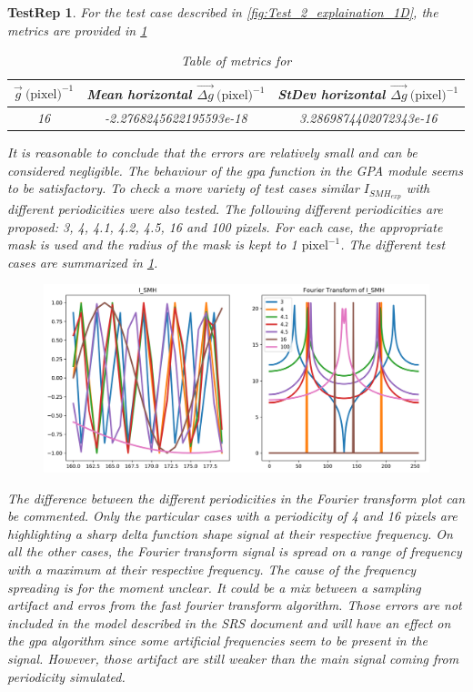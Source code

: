 \documentclass[12pt, titlepage]{article}
\newtheorem{TestRep}{TestRep}
\begin{document}
\begin{TestRep}
For the test case described in \cref{fig:Test_2_explaination_1D}, the metrics are provided in \cref{tb:Metric_test_2_single_case}

\begin{table}[H]
\centering
\begin{tabular}{|c|c|c|}
\hline
$\overrightarrow{g} \ \text{(pixel)}^{-1}$ & Mean horizontal $\overrightarrow{\Delta g} \ \text{(pixel)}^{-1}$ & StDev horizontal $\overrightarrow{\Delta g} \ \text{(pixel)}^{-1}$ \\
\hline
16			& -2.2768245622195593e-18 & 3.2869874402072343e-16 \\ \hline
\end{tabular}
\caption{Table of metrics for}\label{tb:Metric_test_2_single_case}
\end{table}

It is reasonable to conclude that the errors are relatively small and can be considered negligible. The behaviour of the gpa function in the GPA module seems to be satisfactory. To check a more variety of test cases similar $I_{SMH_{exp}}$ with different periodicities were also tested. The following different periodicities are proposed: 3, 4, 4.1, 4.2, 4.5, 16 and 100 pixels. For each case, the appropriate mask is used and the radius of the mask is kept to 1 $\text{pixel}^{-1}$. The different test cases are summarized in \cref{fig:Test_2_Test_cases}. 

\begin{figure}[H]
\begin{center}
\includegraphics[scale=0.5]{Figures/Test_2_test_cases.png}
\caption{}
\label{fig:Test_2_Test_cases}
\end{center}
\end{figure}

The difference between the different periodicities in the Fourier transform plot can be commented. Only the particular cases with a periodicity of 4 and 16 pixels are highlighting a sharp delta function shape signal at their respective frequency. On all the other cases, the Fourier transform signal is spread on a range of frequency with a maximum at their respective frequency. The cause of the frequency spreading is for the moment unclear. It could be a mix between a sampling artifact and erros from the fast fourier transform algorithm. Those errors are not included in the model described in the SRS document and will have an effect on the gpa algorithm since some artificial frequencies seem to be present in the signal. However, those artifact are still weaker than the main signal coming from periodicity simulated.\medskip


\end{TestRep}
\end{document}
